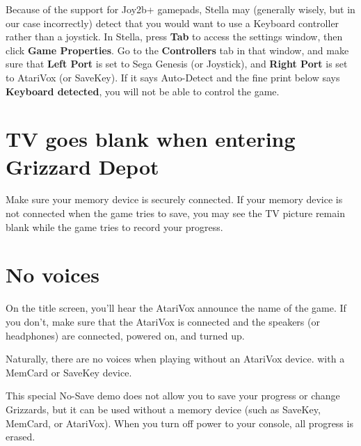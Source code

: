 \documentclass[10pt,twocolumn,openany,article]{memoir}
\begin{document}
Because  of  the support  for  Joy2b+  gamepads, Stella  may  (generally
wisely, but in  our case incorrectly) detect that you  would want to use
a  Keyboard  controller  rather  than   a  joystick.  In  Stella,  press
\textbf{Tab}  to access  the  settings window,  then click  \textbf{Game
  Properties}. Go  to the \textbf{Controllers}  tab in that  window, and
make sure that \textbf{Left Port} is  set to Sega Genesis (or Joystick),
and \textbf{Right  Port} is  set to  AtariVox (or  SaveKey). If  it says
Auto-Detect and  the fine  print below says  \textbf{Keyboard detected},
you will not be able to control the game.

\fi

\ifdefined\NOSAVE\else\ifdefined\ATARIAGESAVE\else

\section*{TV goes blank when entering Grizzard Depot}

Make  sure your  memory device  is  securely connected.  If your  memory
device is not connected when the game  tries to save, you may see the TV
picture remain blank while the game tries to record your progress.

\fi

\section*{No voices}

On the title  screen, you'll hear the AtariVox announce  the name of the
game. If  you don't, make  sure that the  AtariVox is connected  and the
speakers (or headphones) are connected, powered on, and turned up.

Naturally,  there are  no  voices  when playing  \ifdefined\ATARIAGESAVE
without an AtariVox device. \else with a MemCard or SaveKey device. \fi

\fi

\ifdefined\NOSAVE

\pagebreak
{}

This special  No-Save demo does not  allow you to save  your progress or
change Grizzards,  but it can be  used without a memory  device (such as
SaveKey, MemCard, or AtariVox). When you turn off power to your console,
all progress is erased.
\end{document}
